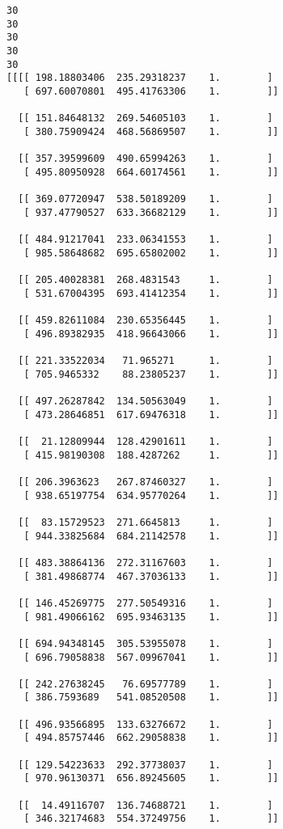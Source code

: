 \documentclass[11pt]{article}
\begin{document}
    \begin{Verbatim}[commandchars=\\\{\}]
30
30
30
30
30
[[[[ 198.18803406  235.29318237    1.        ]
   [ 697.60070801  495.41763306    1.        ]]

  [[ 151.84648132  269.54605103    1.        ]
   [ 380.75909424  468.56869507    1.        ]]

  [[ 357.39599609  490.65994263    1.        ]
   [ 495.80950928  664.60174561    1.        ]]

  [[ 369.07720947  538.50189209    1.        ]
   [ 937.47790527  633.36682129    1.        ]]

  [[ 484.91217041  233.06341553    1.        ]
   [ 985.58648682  695.65802002    1.        ]]

  [[ 205.40028381  268.4831543     1.        ]
   [ 531.67004395  693.41412354    1.        ]]

  [[ 459.82611084  230.65356445    1.        ]
   [ 496.89382935  418.96643066    1.        ]]

  [[ 221.33522034   71.965271      1.        ]
   [ 705.9465332    88.23805237    1.        ]]

  [[ 497.26287842  134.50563049    1.        ]
   [ 473.28646851  617.69476318    1.        ]]

  [[  21.12809944  128.42901611    1.        ]
   [ 415.98190308  188.4287262     1.        ]]

  [[ 206.3963623   267.87460327    1.        ]
   [ 938.65197754  634.95770264    1.        ]]

  [[  83.15729523  271.6645813     1.        ]
   [ 944.33825684  684.21142578    1.        ]]

  [[ 483.38864136  272.31167603    1.        ]
   [ 381.49868774  467.37036133    1.        ]]

  [[ 146.45269775  277.50549316    1.        ]
   [ 981.49066162  695.93463135    1.        ]]

  [[ 694.94348145  305.53955078    1.        ]
   [ 696.79058838  567.09967041    1.        ]]

  [[ 242.27638245   76.69577789    1.        ]
   [ 386.7593689   541.08520508    1.        ]]

  [[ 496.93566895  133.63276672    1.        ]
   [ 494.85757446  662.29058838    1.        ]]

  [[ 129.54223633  292.37738037    1.        ]
   [ 970.96130371  656.89245605    1.        ]]

  [[  14.49116707  136.74688721    1.        ]
   [ 346.32174683  554.37249756    1.        ]]


\end{Verbatim}
\end{document}
